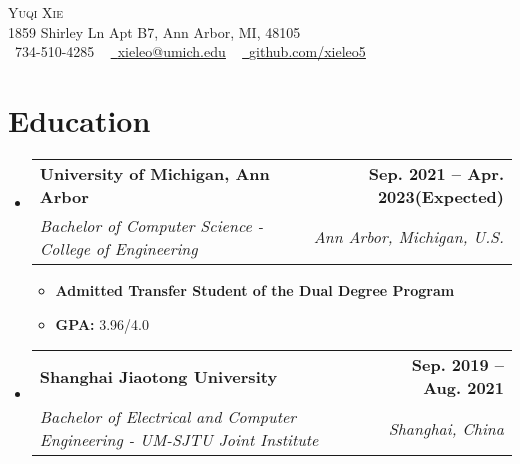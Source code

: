 \documentclass[letterpaper,11pt]{article}
\makeatletter
\newcommand{\resumeSubheading}[4]{
  \vspace{-2pt}\item
    \begin{tabular*}{1.0\textwidth}[t]{l@{\extracolsep{\fill}}r}
      \textbf{#1} & \textbf{\small #2} \\
      \textit{\small#3} & \textit{\small #4} \\
    \end{tabular*}\vspace{-7pt}
}
\newcommand{\resumeSubHeadingListStart}{\begin{itemize}[leftmargin=0.0in, label={}]}
\newcommand{\resumeSubHeadingListEnd}{\end{itemize}}
\makeatother
\begin{document}

\begin{center}
    {\Huge \scshape Yuqi Xie} \\ \vspace{1pt}
    1859 Shirley Ln Apt B7, Ann Arbor, MI, 48105 \\ \vspace{1pt}
    \small \raisebox{-0.1\height}\faPhone\ 734-510-4285 ~ \href{mailto:xieleo@umich.edu}{\raisebox{-0.2\height}\faEnvelope\  \underline{xieleo@umich.edu}} ~ 
    \href{https://github.com/}{\raisebox{-0.2\height}\faGithub\ \underline{github.com/xieleo5}}
    \vspace{-8pt}
\end{center}


\section{Education}
  \resumeSubHeadingListStart
    \resumeSubheading
      {University of Michigan, Ann Arbor}{Sep. 2021 -- Apr. 2023(Expected)}
      {Bachelor of Computer Science - College of Engineering}{Ann Arbor, Michigan, U.S.}
    \begin{itemize}
      \item \textbf{Admitted Transfer Student of the Dual Degree Program}
      \item \textbf{GPA: }3.96/4.0
    \end{itemize}
    \vspace*{4.0\multicolsep}
  \resumeSubHeadingListEnd
  \resumeSubHeadingListStart
    \resumeSubheading
      {Shanghai Jiaotong University}{Sep. 2019 -- Aug. 2021}
      {Bachelor of Electrical and Computer Engineering - UM-SJTU Joint Institute}{Shanghai, China}
  \resumeSubHeadingListEnd
\end{document}
